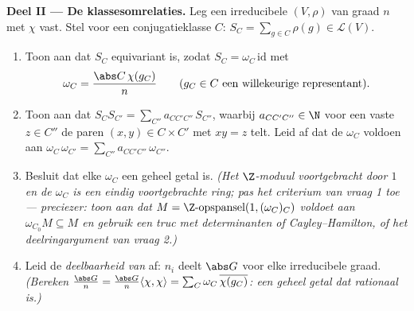 \begin{problem}
\medskip
\noindent\textbf{Deel II --- De klassesomrelaties.} Leg een
irreducibele $(V, \rho)$ van graad $n$ met  $\chi$ vast.
Stel voor een conjugatieklasse $C$: $S_C = \sum_{g \in C}\rho(g)
\in \mathcal L(V)$.
\begin{enumerate}[resume]
  \item Toon aan dat $S_C$ equivariant is, zodat $S_C =
        \omega_C\,\mathrm{id}$ met
        \[
        \omega_C = \frac{\abs C\,\chi(g_C)}{n}
        \qquad (g_C \in C \text{ een willekeurige representant}).
        \]
  \item Toon aan dat $S_CS_{C'} = \sum_{C''}
        a_{CC'C''}\,S_{C''}$, waarbij $a_{CC'C''} \in \N$ voor een
        vaste $z \in C''$ de paren $(x, y) \in C \times C'$ met
        $xy = z$ telt. Leid af dat de $\omega_C$ voldoen aan
        $\omega_C\,\omega_{C'} = \sum_{C''}
        a_{CC'C''}\,\omega_{C''}$.
  \item Besluit dat elke $\omega_C$ een geheel  getal
        is. \emph{(Het $\Z$-moduul voortgebracht door $1$ en de
        $\omega_C$ is een eindig voortgebrachte ring; pas het
        criterium van vraag 1 toe --- preciezer: toon aan dat $M =
        \Z\text{-opspansel}(1, (\omega_C)_C)$ voldoet aan
        $\omega_{C_0} M \subseteq M$ en gebruik een truc met
        determinanten of Cayley--Hamilton, of het deelringargument
        van vraag 2.)}
  \item Leid de \emph{deelbaarheid van } af: $n_i$ deelt
        $\abs G$ voor elke irreducibele graad. \emph{(Bereken
        $\frac{\abs G}{n} = \frac{\abs G}{n}
        \langle\chi,\chi\rangle = \sum_C \omega_C\,
        \overline{\chi(g_C)}$: een geheel  getal dat
        rationaal is.)}
\end{enumerate}


\end{problem}
